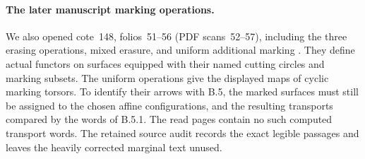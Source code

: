 \paragraph{The later manuscript marking operations.}
We also opened cote~148, folios~51--56 (PDF scans~52--57),
including the three erasing operations, mixed erasure, and
uniform additional marking \cite[folios~51--56]{GrothendieckCote148}.
They define actual functors on surfaces equipped with their
named cutting circles and marking subsets.  The uniform
operations give the displayed maps of cyclic marking torsors.
To identify their arrows with B.5, the marked surfaces must
still be assigned to the chosen affine configurations, and
the resulting transports compared by the words of B.5.1.
The read pages contain no such computed transport words.
The retained source audit records the exact legible passages
and leaves the heavily corrected marginal text unused.
